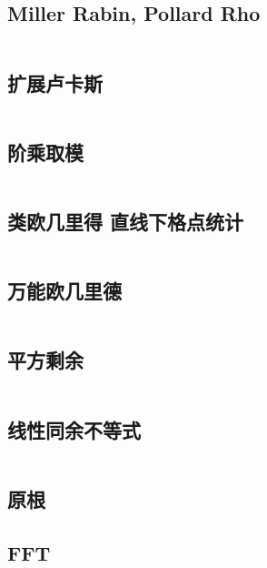 \documentclass[titlepage, a4paper, 11pt]{article}
\begin{document}
\begin{spacing}{1.15}
				\subsection{Miller Rabin, Pollard Rho}
					\inputminted{cpp}{src/Math/Miller Rabin And Pollard Rho.cpp}
				\subsection{扩展卢卡斯}
					\inputminted{cpp}{src/Math/扩展卢卡斯.cpp}
				\subsection{阶乘取模}
					\inputminted{cpp}{src/Math/Factorial Mod.cpp}
				\subsection{类欧几里得 直线下格点统计}
					\inputminted{cpp}{src/Math/直线下格点统计.cpp}
				\subsection{万能欧几里德}
					\inputminted{cpp}{src/zjj/euclid.cpp}
				\subsection{平方剩余}
					\inputminted{cpp}{src/Math/平方剩余.cpp}
				\subsection{线性同余不等式}
					\inputminted{cpp}{src/Math/线性同余不等式.cpp}
				\subsection{原根}
					
				\subsection{FFT}
					\inputminted{cpp}{src/Math/FFT.cpp}

\end{spacing}
\end{document}
